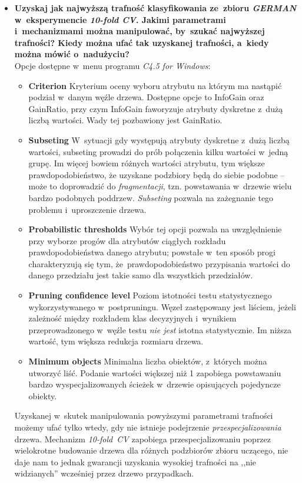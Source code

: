 \begin{itemize}
\item \textbf{Uzyskaj jak najwyższą trafność klasyfikowania ze~zbioru \emph{GERMAN} w~eksperymencie \emph{10-fold CV}. Jakimi parametrami i~mechanizmami można manipulować, by~szukać najwyższej trafności? Kiedy można ufać tak uzyskanej trafności, a~kiedy można mówić o~nadużyciu?}
\\Opcje dostępne w~menu programu \emph{C4.5 for Windows}:
\begin{itemize}
\item \textbf{Criterion} 
Kryterium oceny wyboru atrybutu na którym ma nastąpić podział w~danym węźle drzewa. Dostępne opcje to InfoGain oraz GainRatio, przy czym InfoGain faworyzuje atrybuty dyskretne z~dużą liczbą wartości. Wady tej pozbawiony jest GainRatio.

\item \textbf{Subseting} 
W~sytuacji gdy występują atrybuty dyskretne z~dużą liczbą wartości, subseting prowadzi do prób połączenia kilku wartości w~jedną grupę. Im więcej bowiem różnych wartości atrybutu, tym większe prawdopodobieństwo, że uzyskane podzbiory będą do siebie podobne -- może to doprowadzić do \emph{fragmentacji}, tzn. powstawania w~drzewie wielu bardzo podobnych poddrzew. \emph{Subseting} pozwala na zażegnanie tego problemu i~uproszczenie drzewa.

\item \textbf{Probabilistic thresholds}
Wybór tej opcji pozwala na uwzględnienie przy wyborze progów dla atrybutów ciągłych rozkładu prawdopodobieństwa danego atrybutu; powstałe w~ten sposób progi charakteryzują się tym, że~prawdopodobieństwo przypisania wartości do danego przedziału jest takie samo dla wszystkich przedziałów.

\item \textbf{Pruning confidence level} 
Poziom istotności testu statystycznego wykorzystywanego w~postpruningu. Węzeł zastępowany jest liściem, jeżeli zależność między rozkładem klas decyzyjnych i~wynikiem przeprowadzonego w~węźle testu \emph{nie jest} istotna statystycznie. Im niższa wartość, tym większa redukcja rozmiaru drzewa.

\item \textbf{Minimum objects}
Minimalna liczba obiektów, z~których można utworzyć liść. Podanie wartości większej niż 1 zapobiega powstawaniu bardzo wyspecjalizowanych ścieżek w~drzewie opisujących pojedyncze obiekty.
\end{itemize}
Uzyskanej w~skutek manipulowania powyższymi parametrami trafności możemy ufać tylko wtedy, gdy nie istnieje podejrzenie \emph{przespecjalizowania} drzewa. Mechanizm \emph{10-fold~CV} zapobiega przespecjalizowaniu poprzez wielokrotne budowanie drzewa dla różnych podzbiorów zbioru uczącego, nie daje nam to jednak gwarancji uzyskania wysokiej trafności na ,,nie widzianych'' wcześniej przez drzewo przypadkach.


\end{itemize}
